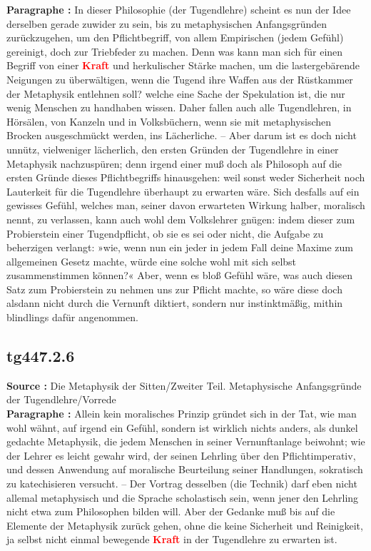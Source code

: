 \documentclass[a4paper,12pt,twoside]{book}
\newcommand{\match}[1]{\textcolor{red}{\textbf{#1}}}
\begin{document}
	\textbf{Paragraphe : }In dieser Philosophie (der Tugendlehre) scheint es nun der Idee derselben gerade zuwider zu sein, bis zu metaphysischen Anfangsgründen zurückzugehen, um den Pflichtbegriff, von allem Empirischen (jedem Gefühl) gereinigt, doch zur Triebfeder zu machen. Denn was kann man sich für einen Begriff von einer \match{Kraft} und herkulischer Stärke  machen, um die lastergebärende Neigungen zu überwältigen, wenn die Tugend ihre Waffen aus der Rüstkammer der Metaphysik entlehnen soll? welche eine Sache der Spekulation ist, die nur wenig Menschen zu handhaben wissen. Daher fallen auch alle Tugendlehren, in Hörsälen, von Kanzeln und in Volksbüchern, wenn sie mit metaphysischen Brocken ausgeschmückt werden, ins Lächerliche. – Aber darum ist es doch nicht unnütz, vielweniger lächerlich, den ersten Gründen der Tugendlehre in einer Metaphysik nachzuspüren; denn irgend einer muß doch als Philosoph auf die ersten Gründe dieses Pflichtbegriffs hinausgehen: weil sonst weder Sicherheit noch Lauterkeit für die Tugendlehre überhaupt zu erwarten wäre. Sich desfalls auf ein gewisses Gefühl, welches man, seiner davon erwarteten Wirkung halber, moralisch nennt, zu verlassen, kann auch wohl dem Volkslehrer gnügen: indem dieser zum Probierstein einer Tugendpflicht, ob sie es sei oder nicht, die Aufgabe zu beherzigen verlangt: »wie, wenn nun ein jeder in jedem Fall deine Maxime zum allgemeinen Gesetz machte, würde eine solche wohl mit sich selbst zusammenstimmen können?« Aber, wenn es bloß Gefühl wäre, was auch diesen Satz zum Probierstein zu nehmen uns zur Pflicht machte, so wäre diese doch alsdann nicht durch die Vernunft diktiert, sondern nur instinktmäßig, mithin blindlings dafür angenommen. 
	
	\subsection*{tg447.2.6} 
	\textbf{Source : }Die Metaphysik der Sitten/Zweiter Teil. Metaphysische Anfangsgründe der Tugendlehre/Vorrede\\  
	
	\textbf{Paragraphe : }Allein kein moralisches Prinzip gründet sich in der Tat, wie man wohl wähnt, auf irgend ein Gefühl, sondern ist wirklich nichts anders, als dunkel gedachte Metaphysik, die jedem Menschen in seiner Vernunftanlage beiwohnt; wie der Lehrer es leicht gewahr wird, der seinen Lehrling über den Pflichtimperativ, und dessen Anwendung auf moralische Beurteilung seiner Handlungen, sokratisch zu katechisieren versucht. – Der Vortrag desselben (die Technik) darf eben nicht allemal metaphysisch und die Sprache scholastisch sein, wenn jener den Lehrling nicht etwa zum Philosophen bilden will. Aber der Gedanke muß bis auf die Elemente der Metaphysik zurück gehen, ohne die keine Sicherheit und Reinigkeit, ja selbst nicht einmal bewegende \match{Kraft} in der Tugendlehre zu erwarten ist. 
	
\end{document}
